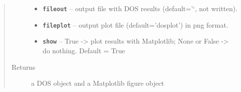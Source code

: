 \documentclass[letterpaper,10pt,english]{sphinxmanual}
\begin{document}
\begin{fulllineitems}
\begin{quote}
\begin{description}
\begin{itemize}
\item {} 
\textbf{\texttt{fileout}} -- output file with DOS results (default='`, not written).

\item {} 
\textbf{\texttt{fileplot}} -- output plot file (default='dosplot') in png format.

\item {} 
\textbf{\texttt{show}} -- True -\textgreater{} plot results with Matplotlib; None or False -\textgreater{} do nothing. Default = True

\end{itemize}

\item[{Returns}] \leavevmode
a DOS object and a Matplotlib figure object

\end{description}\end{quote}

\end{fulllineitems}

\end{document}
